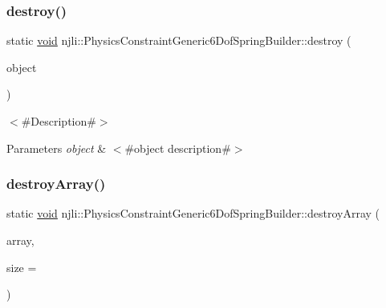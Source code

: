 \subsubsection{\texorpdfstring{destroy()}{destroy()}}
{\footnotesize\ttfamily static \mbox{\hyperlink{_thread_8h_af1e856da2e658414cb2456cb6f7ebc66}{void}} njli\+::\+Physics\+Constraint\+Generic6\+Dof\+Spring\+Builder\+::destroy (\begin{DoxyParamCaption}\item[{\mbox{\hyperlink{classnjli_1_1_physics_constraint_generic6_dof_spring_builder}{Physics\+Constraint\+Generic6\+Dof\+Spring\+Builder}} $\ast$}]{object }\end{DoxyParamCaption})\hspace{0.3cm}{\ttfamily [static]}}

$<$\#\+Description\#$>$


\begin{DoxyParams}{Parameters}
{\em object} & $<$\#object description\#$>$ \\
\hline
\end{DoxyParams}
\mbox{\label{classnjli_1_1_physics_constraint_generic6_dof_spring_builder_a485a6bf0d55a3a9f548551373bb09fb4}} 
\subsubsection{\texorpdfstring{destroy\+Array()}{destroyArray()}}
{\footnotesize\ttfamily static \mbox{\hyperlink{_thread_8h_af1e856da2e658414cb2456cb6f7ebc66}{void}} njli\+::\+Physics\+Constraint\+Generic6\+Dof\+Spring\+Builder\+::destroy\+Array (\begin{DoxyParamCaption}\item[{\mbox{\hyperlink{classnjli_1_1_physics_constraint_generic6_dof_spring_builder}{Physics\+Constraint\+Generic6\+Dof\+Spring\+Builder}} $\ast$$\ast$}]{array,  }\item[{const \mbox{\hyperlink{_util_8h_a10e94b422ef0c20dcdec20d31a1f5049}{u32}}}]{size = {} }\end{DoxyParamCaption})\hspace{0.3cm}{\ttfamily [static]}}

